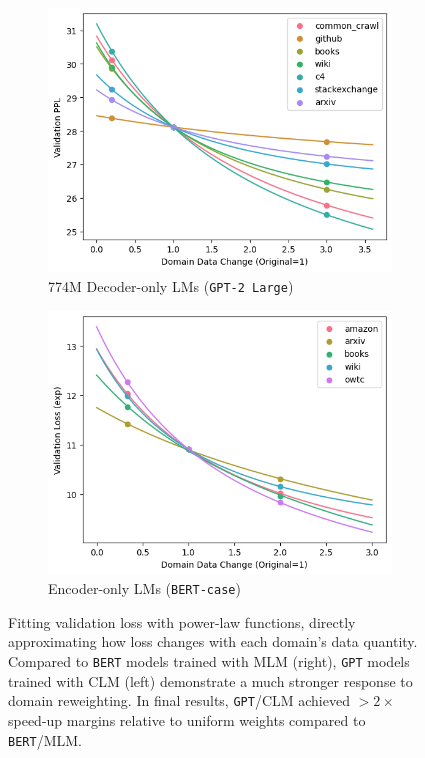 \documentclass{article} %
\begin{document}
\begin{appendices}{}
\begin{figure}[h!]
    \centering\vspace{-0.5em}
    \begin{subfigure}[b]{0.45\textwidth}
        \includegraphics[width=\textwidth]{gptfigs/gptddo.png}
        \caption{774M Decoder-only LMs (\texttt{GPT-2 Large})}
    \end{subfigure}
    \hspace{2em}
    \begin{subfigure}[b]{0.45\textwidth}
        \includegraphics[width=\textwidth]{bertfigs/bertddo.png}
        \caption{Encoder-only LMs (\texttt{BERT-case})}
    \end{subfigure}
    \caption{Fitting validation loss with power-law functions, directly approximating how loss changes with each domain's data quantity. Compared to \texttt{BERT} models trained with MLM (right), \texttt{GPT} models trained with CLM (left) demonstrate a much stronger response to domain reweighting. In final results, \texttt{GPT}/CLM achieved $> 2\times$ speed-up margins relative to uniform weights compared to \texttt{BERT}/MLM. }
    \label{fig:figure30}\vspace{-1em}
\end{figure}


\end{appendices}
\end{document}
